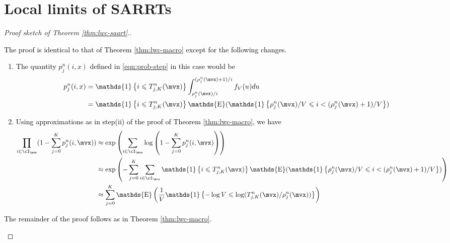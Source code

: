 \documentclass[letterpaper,11pt,reqno]{amsart}
\theoremstyle{definition}
\renewcommand{\leq}{\leqslant}
\newcommand{\ind}{\mathds{1}}
\newcommand{\set}[1]{\left\{#1\right\}}
\DeclareMathOperator{\E}{\mathds{E}}
\begin{document}
\section{Local limits of SARRTs}
\begin{proof}[Proof sketch of Theorem \ref{thm:lwc-saart}.]
    \textcolor{black}{The proof is identical to that of Theorem \ref{thm:lwc-macro} except for the following changes. \begin{enumerate}
        \item The quantity $p_{j}^n(i,x)$ defined in \eqref{eqn:prob-step} in this case would be \begin{align*}
            p_{j}^n(i,x) &= \ind\set{i\leq T_{j,K}^n(\mvx)} \int_{\rho_{j}^n(\mvx)/i}^{(\rho_{j}^n(\mvx)+1)/i} f_{V}(u)du\\
            &= \ind\set{i\leq T_{j,K}^n(\mvx)} \E(\ind\set{\rho_{j}^n(\mvx)/V \leq i < (\rho_{j}^n(\mvx)+1)/V})
        \end{align*}
        \item Using approximations as in step(ii) of the proof of Theorem \ref{thm:lwc-macro}, we have \begin{align*}
            \prod_{i\in \cI_{\mvx}}(1-\sum_{j=0}^K p_{j}^n(i,\mvx)) &\approx \exp\left(\sum_{i\in \cI_{\mvx}}\log\left(1-\sum_{j=0}^K p_{j}^n(i,\mvx)\right)\right)\\
            &\approx \exp\left(-\sum_{j=0}
        ^K \sum_{i\in \cI_{\mvx}}\ind\set{i\leq T_{j,K}^n(\mvx)} \E(\ind\set{\rho_{j}^n(\mvx)/V \leq i < (\rho_{j}^n(\mvx)+1)/V})\right)\\
        &\approx \sum_{j=0}^K \E\left(\frac{1}{V} \ind\set{-\log V \leq \log(T_{j,K}^n(\mvx)/\rho_{j}^n(\mvx)) }\right)
        \end{align*}
    \end{enumerate}  The remainder of the proof follows as in Theorem \ref{thm:lwc-macro}.}
\end{proof}
\end{document}
